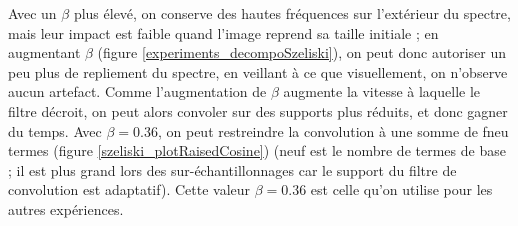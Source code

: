 	Avec un $\beta$ plus élevé, on conserve des hautes fréquences sur l'extérieur du spectre, mais leur impact est faible quand l'image reprend sa taille initiale ; en augmentant $\beta$ (figure \ref{experiments_decompoSzeliski}), on peut donc autoriser un peu plus de repliement du spectre, en veillant à ce que visuellement, on n'observe aucun artefact. Comme l'augmentation de $\beta$ augmente la vitesse à laquelle le filtre décroit, on peut alors convoler sur des supports plus réduits, et donc gagner du temps. Avec $\beta = 0.36$, on peut restreindre la convolution à une somme de fneu termes (figure \ref{szeliski_plotRaisedCosine}) (neuf est le nombre de termes de base ; il est plus grand lors des sur-échantillonnages car le support du filtre de convolution est adaptatif). Cette valeur $\beta = 0.36$ est celle qu'on utilise pour les autres expériences.
 
